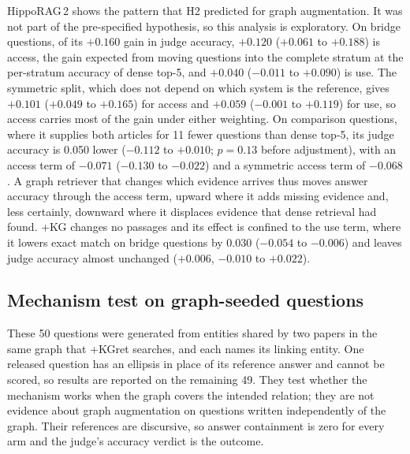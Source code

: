 \documentclass[preprint,12pt]{elsarticle}
\begin{document}
HippoRAG\,2 shows the pattern that H2 predicted for graph augmentation. It was
not part of the pre-specified hypothesis, so this analysis is exploratory. On
bridge questions, of its $+0.160$ gain in judge accuracy, $+0.120$ ($+0.061$
to $+0.188$) is access, the gain expected from moving questions into the
complete stratum at the per-stratum accuracy of dense top-5, and $+0.040$
($-0.011$ to $+0.090$) is use. The symmetric split, which does not depend on
which system is the reference, gives $+0.101$ ($+0.049$ to $+0.165$) for
access and $+0.059$ ($-0.001$ to $+0.119$) for use, so access carries most of
the gain under either weighting. On comparison questions, where it supplies
both articles for 11 fewer questions than dense top-5, its judge accuracy is
0.050 lower ($-0.112$ to $+0.010$; $p=0.13$ before adjustment), with an access
term of $-0.071$ ($-0.130$ to $-0.022$) and a symmetric access term of
$-0.068$. A graph retriever that changes which evidence arrives thus moves
answer accuracy through the access term, upward where it adds missing
evidence and, less certainly, downward where it displaces evidence that dense
retrieval had found. +KG changes no passages and its effect is confined to
the use term, where it lowers exact match on bridge questions by 0.030
($-0.054$ to $-0.006$) and leaves judge accuracy almost unchanged ($+0.006$,
$-0.010$ to $+0.022$).

\subsection{Mechanism test on graph-seeded questions}

These 50 questions were generated from entities shared by two papers in the
same graph that +KGret searches, and each names its linking entity. One
released question has an ellipsis in place of its reference answer and cannot
be scored, so results are reported on the remaining 49. They test whether the
mechanism works when the graph covers the intended relation; they are not
evidence about graph augmentation on questions written independently of the
graph. Their references are discursive, so answer containment is zero for
every arm and the judge's accuracy verdict is the outcome.
\end{document}
